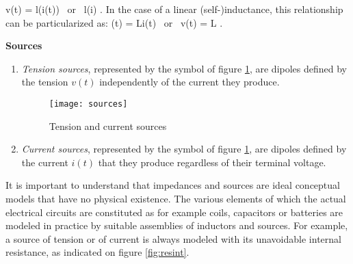 \begin{description}
\begin{enumerate}
\eqnn
v(t) =  l(i(t)) 
\mbox{ or } l(i) \triangleq  {}.
\eeqnn
In the case of a linear (self-)inductance, this relationship can be particularized as:
\eqnn
\phi(t) = Li(t) \;\; \mbox{ or } v(t) = L .
\eeqnn
\end{enumerate}
\item{\bf Sources}
\begin{enumerate}
\item {\em Tension sources}, represented by the symbol of figure \ref{fig:sources}, are dipoles defined by the tension $v(t)$ independently of the current they produce.
\begin{figure}[htbp]
\begin{center}
\texttt{[image: sources]}
\caption{Tension and current sources}
\label{fig:sources}
\end{center}
\end{figure}
\item {\em Current sources}, represented by the symbol of figure \ref{fig:sources}, are dipoles defined by the current $i(t)$ that they produce regardless of their terminal voltage.
\end{enumerate} 
\end{description}
It is important to understand that impedances and sources are ideal conceptual models that have no physical existence. The various elements of which the actual electrical circuits are constituted as for example coils, capacitors or batteries are modeled in practice by suitable assemblies of inductors and sources. For example, a source of tension or of current is always modeled with its unavoidable internal resistance, as indicated on figure \ref{fig:resint}.

